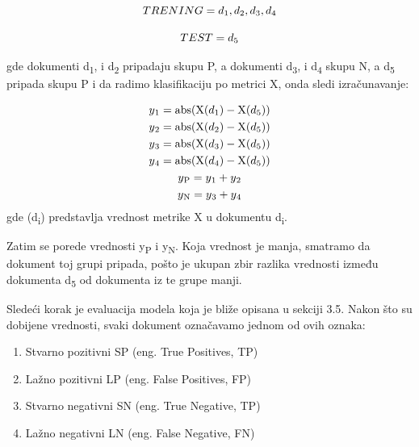\documentclass[12pt,oneside]{memoir}
\begin{document}
\begin{equation}
	TRENING = {d\textsubscript{1}, d\textsubscript{2}, d\textsubscript{3},d \textsubscript{4}}
\end{equation}

\begin{equation}
	TEST = {d\textsubscript{5}}
\end{equation}

\noindent
gde dokumenti d\textsubscript{1}, i d\textsubscript{2} pripadaju skupu P, a dokumenti d\textsubscript{3}, i d\textsubscript{4} skupu N, a d\textsubscript{5} pripada skupu P i da radimo klasifikaciju po metrici X, onda sledi izračunavanje:

\begin{gather*}
	y\textsubscript{1} = \text{abs}(\text{X}(d\textsubscript{1}) - \text{X}(d\textsubscript{5})) \\
	y\textsubscript{2} = \text{abs}(\text{X}(d\textsubscript{2}) - \text{X}(d\textsubscript{5})) \\
	y\textsubscript{3} = \text{abs}(\text{X}(d\textsubscript{3}) - \text{X}(d\textsubscript{5})) \\
	y\textsubscript{4} = \text{abs}(\text{X}(d\textsubscript{4}) - \text{X}(d\textsubscript{5})) \\
	y\textsubscript{P} = y\textsubscript{1} + y\textsubscript{2} \\
	y\textsubscript{N} = y\textsubscript{3} + y\textsubscript{4}
\end{gather*}
\noindent
gde (d\textsubscript{i}) predstavlja vrednost metrike X u dokumentu d\textsubscript{i}.

{\setlength{\parindent}{0cm}
Zatim se porede vrednosti y\textsubscript{P} i y\textsubscript{N}. Koja vrednost je manja, smatramo da dokument toj grupi pripada, pošto je ukupan zbir razlika vrednosti između dokumenta {d\textsubscript{5}} od dokumenta iz te grupe manji.

Sledeći korak je evaluacija modela koja je bliže opisana u sekciji 3.5. Nakon što su dobijene vrednosti, svaki dokument označavamo jednom od ovih oznaka:
}

\begin{enumerate}
\item Stvarno pozitivni SP (eng. True Positives, TP)
\item Lažno pozitivni LP (eng.  False Positives,  FP)
\item Stvarno negativni SN (eng.  True Negative, TP)
\item Lažno negativni LN (eng.  False Negative, FN)
\end{enumerate}
\end{document}
